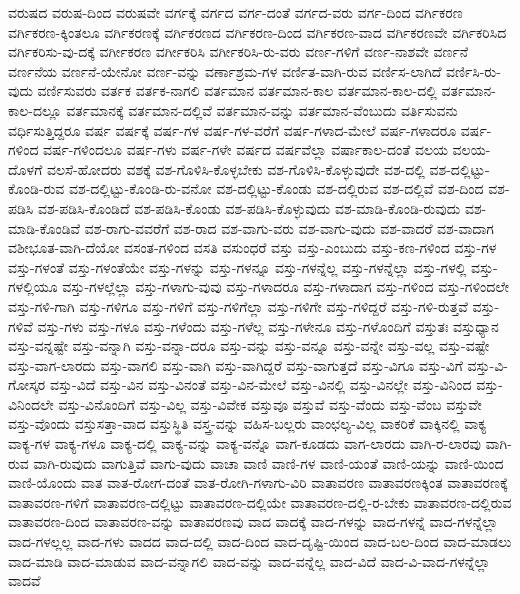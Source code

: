 {ವರುಷದ
ವರುಷ-ದಿಂದ
ವರುಷವೇ
ವರ್ಗಕ್ಕೆ
ವರ್ಗದ
ವರ್ಗ-ದಂತೆ
ವರ್ಗದ-ವರು
ವರ್ಗ-ದಿಂದ
ವರ್ಗಿಕರಣ
ವರ್ಗಿಕರಣ-ಕ್ಕಿಂತಲೂ
ವರ್ಗಿಕರಣಕ್ಕೆ
ವರ್ಗಿಕರಣದ
ವರ್ಗಿಕರಣ-ದಿಂದ
ವರ್ಗಿಕರಣ-ವಾದ
ವರ್ಗಿಕರಣವೇ
ವರ್ಗಿಕರಿಸಿದ
ವರ್ಗಿಕರಿಸು-ವು-ದಕ್ಕೆ
ವರ್ಗೀಕರಣ
ವರ್ಗೀಕರಿಸಿ
ವರ್ಗೀಕರಿಸಿ-ರು-ವರು
ವರ್ಣ-ಗಳಿಗೆ
ವರ್ಣ-ನಾಶವೇ
ವರ್ಣನೆ
ವರ್ಣನೆಯ
ವರ್ಣನೆ-ಯೇನೋ
ವರ್ಣ-ವನ್ನು
ವರ್ಣಾಶ್ರಮ-ಗಳ
ವರ್ಣಿತ-ವಾಗಿ-ರುವ
ವರ್ಣಿಸ-ಲಾಗಿದೆ
ವರ್ಣಿಸಿ-ರು-ವುದು
ವರ್ಣಿಸುವರು
ವರ್ತಕ
ವರ್ತಕ-ನಾಗಲಿ
ವರ್ತಮಾನ
ವರ್ತಮಾನ-ಕಾಲ
ವರ್ತಮಾನ-ಕಾಲ-ದಲ್ಲಿ
ವರ್ತಮಾನ-ಕಾಲ-ದಲ್ಲೂ
ವರ್ತಮಾನಕ್ಕೆ
ವರ್ತಮಾನ-ದಲ್ಲಿವೆ
ವರ್ತಮಾನ-ವನ್ನು
ವರ್ತಮಾನ-ವೆಂಬುದು
ವರ್ತಿಸುವನು
ವರ್ಧಿಸುತ್ತಿದ್ದರೂ
ವರ್ಷ
ವರ್ಷಕ್ಕೆ
ವರ್ಷ-ಗಳ
ವರ್ಷ-ಗಳ-ವರೆಗೆ
ವರ್ಷ-ಗಳಾದ-ಮೇಲೆ
ವರ್ಷ-ಗಳಾದರೂ
ವರ್ಷ-ಗಳಿಂದ
ವರ್ಷ-ಗಳಿಂದಲೂ
ವರ್ಷ-ಗಳು
ವರ್ಷ-ಗಳೇ
ವರ್ಷದ
ವರ್ಷವೆಲ್ಲಾ
ವರ್ಷಾಕಾಲ-ದಂತೆ
ವಲಯ
ವಲಯ-ದೊಳಗೆ
ವಲಸೆ-ಹೋದರು
ವಶಕ್ಕೆ
ವಶ-ಗೊಳಿಸಿ-ಕೊಳ್ಳಬೇಕು
ವಶ-ಗೊಳಿಸಿ-ಕೊಳ್ಳುವುದೇ
ವಶ-ದಲ್ಲಿ
ವಶ-ದಲ್ಲಿಟ್ಟು-ಕೊಂಡಿ-ರುವ
ವಶ-ದಲ್ಲಿಟ್ಟು-ಕೊಂಡಿ-ರು-ವನೋ
ವಶ-ದಲ್ಲಿಟ್ಟು-ಕೊಂಡು
ವಶ-ದಲ್ಲಿರುವ
ವಶ-ದಲ್ಲಿವೆ
ವಶ-ದಿಂದ
ವಶ-ಪಡಿಸಿ
ವಶ-ಪಡಿಸಿ-ಕೊಂಡಿದೆ
ವಶ-ಪಡಿಸಿ-ಕೊಂಡು
ವಶ-ಪಡಿಸಿ-ಕೊಳ್ಳುವುದು
ವಶ-ಮಾಡಿ-ಕೊಂಡಿ-ರುವುದು
ವಶ-ಮಾಡಿ-ಕೊಂಡಿವೆ
ವಶ-ರಾಗು-ವವರೆಗೆ
ವಶ-ರಾದ
ವಶ-ವಾಗು-ವರು
ವಶ-ವಾಗು-ವುದು
ವಶ-ವಾದರೆ
ವಶ-ವಾದಾಗ
ವಶೀಭೂತ-ವಾಗಿ-ದೆಯೋ
ವಸಂತ-ಗಳಿಂದ
ವಸತಿ
ವಸುಂಧರೆ
ವಸ್ತು
ವಸ್ತು-ಎಂಬುದು
ವಸ್ತು-ಕಣ-ಗಳಿಂದ
ವಸ್ತು-ಗಳ
ವಸ್ತು-ಗಳಂತೆ
ವಸ್ತು-ಗಳಂತೆಯೇ
ವಸ್ತು-ಗಳನ್ನು
ವಸ್ತು-ಗಳನ್ನೂ
ವಸ್ತು-ಗಳನ್ನೆಲ್ಲ
ವಸ್ತು-ಗಳನ್ನೆಲ್ಲಾ
ವಸ್ತು-ಗಳಲ್ಲಿ
ವಸ್ತು-ಗಳಲ್ಲಿಯೂ
ವಸ್ತು-ಗಳಲ್ಲೆಲ್ಲಾ
ವಸ್ತು-ಗಳಾಗು-ವುವು
ವಸ್ತು-ಗಳಾದರೂ
ವಸ್ತು-ಗಳಾದಾಗ
ವಸ್ತು-ಗಳಿಂದ
ವಸ್ತು-ಗಳಿಂದಲೇ
ವಸ್ತು-ಗಳಿ-ಗಾಗಿ
ವಸ್ತು-ಗಳಿಗೂ
ವಸ್ತು-ಗಳಿಗೆ
ವಸ್ತು-ಗಳಿಗೆಲ್ಲಾ
ವಸ್ತು-ಗಳಿಗೇ
ವಸ್ತು-ಗಳಿದ್ದರೆ
ವಸ್ತು-ಗಳಿ-ರುತ್ತವೆ
ವಸ್ತು-ಗಳಿವೆ
ವಸ್ತು-ಗಳು
ವಸ್ತು-ಗಳೂ
ವಸ್ತು-ಗಳೆಂದು
ವಸ್ತು-ಗಳೆಲ್ಲ
ವಸ್ತು-ಗಳೇನೂ
ವಸ್ತು-ಗಳೊಂದಿಗೆ
ವಸ್ತುತಃ
ವಸ್ತುಧ್ಯಾನ
ವಸ್ತು-ವನ್ನಷ್ಟೇ
ವಸ್ತು-ವನ್ನಾಗಿ
ವಸ್ತು-ವನ್ನಾ-ದರೂ
ವಸ್ತು-ವನ್ನು
ವಸ್ತು-ವನ್ನೂ
ವಸ್ತು-ವನ್ನೇ
ವಸ್ತು-ವಲ್ಲ
ವಸ್ತು-ವಷ್ಟೇ
ವಸ್ತು-ವಾಗ-ಲಾರದು
ವಸ್ತು-ವಾಗಲಿ
ವಸ್ತು-ವಾಗಿ
ವಸ್ತು-ವಾಗಿದ್ದರೆ
ವಸ್ತು-ವಾಗುತ್ತದೆ
ವಸ್ತು-ವಿಗೂ
ವಸ್ತು-ವಿಗೆ
ವಸ್ತು-ವಿ-ಗೋಸ್ಕರ
ವಸ್ತು-ವಿದೆ
ವಸ್ತು-ವಿನ
ವಸ್ತು-ವಿನಂತೆ
ವಸ್ತು-ವಿನ-ಮೇಲೆ
ವಸ್ತು-ವಿನಲ್ಲಿ
ವಸ್ತು-ವಿನಲ್ಲೇ
ವಸ್ತು-ವಿನಿಂದ
ವಸ್ತು-ವಿನಿಂದಲೇ
ವಸ್ತು-ವಿನೊಂದಿಗೆ
ವಸ್ತು-ವಿಲ್ಲ
ವಸ್ತು-ವಿವೇಕ
ವಸ್ತುವೂ
ವಸ್ತುವೆ
ವಸ್ತು-ವೆಂದು
ವಸ್ತು-ವೆಂಬ
ವಸ್ತುವೇ
ವಸ್ತು-ವೊಂದು
ವಸ್ತುಸತ್ತಾ-ವಾದ
ವಸ್ತುಸ್ಥಿತಿ
ವಸ್ತ್ರ-ವನ್ನು
ವಹಿಸ-ಬಲ್ಲರು
ವಾಂಛಲ್ಯ-ವಿಲ್ಲ
ವಾಕರಿಕೆ
ವಾಕ್ಕಿನಲ್ಲಿ
ವಾಕ್ಯ
ವಾಕ್ಯ-ಗಳ
ವಾಕ್ಯ-ಗಳೂ
ವಾಕ್ಯ-ದಲ್ಲಿ
ವಾಕ್ಯ-ವನ್ನು
ವಾಕ್ಯ-ವನ್ನೊ
ವಾಗ-ಕೂಡದು
ವಾಗ-ಲಾರದು
ವಾಗಿ-ರ-ಲಾರವು
ವಾಗಿ-ರುವ
ವಾಗಿ-ರುವುದು
ವಾಗುತ್ತಿವೆ
ವಾಗು-ವುದು
ವಾಚಾ
ವಾಣಿ
ವಾಣಿ-ಗಳ
ವಾಣಿ-ಯಂತೆ
ವಾಣಿ-ಯನ್ನು
ವಾಣಿ-ಯಿಂದ
ವಾಣಿ-ಯೊಂದು
ವಾತ
ವಾತ-ರೋಗ-ದಂತೆ
ವಾತ-ರೋಗಿ-ಗಳಾಗು-ವಿರಿ
ವಾತಾವರಣ
ವಾತಾವರಣಕ್ಕಿಂತ
ವಾತಾವರಣಕ್ಕೆ
ವಾತಾವರಣ-ಗಳಿಗೆ
ವಾತಾವರಣ-ದಲ್ಲಿಟ್ಟು
ವಾತಾವರಣ-ದಲ್ಲಿಯೇ
ವಾತಾವರಣ-ದಲ್ಲಿ-ರ-ಬೇಕು
ವಾತಾವರಣ-ದಲ್ಲಿರುವ
ವಾತಾವರಣ-ದಿಂದ
ವಾತಾವರಣ-ವನ್ನು
ವಾತಾವರಣವು
ವಾದ
ವಾದಕ್ಕೆ
ವಾದ-ಗಳನ್ನು
ವಾದ-ಗಳನ್ನೆ
ವಾದ-ಗಳನ್ನೆಲ್ಲಾ
ವಾದ-ಗಳಲ್ಲಲ್ಲ
ವಾದ-ಗಳು
ವಾದದ
ವಾದ-ದಲ್ಲಿ
ವಾದ-ದಿಂದ
ವಾದ-ದೃಷ್ಟಿ-ಯಿಂದ
ವಾದ-ಬಲ-ದಿಂದ
ವಾದ-ಮಾಡಲು
ವಾದ-ಮಾಡಿ
ವಾದ-ಮಾಡುವ
ವಾದ-ವನ್ನಾಗಲಿ
ವಾದ-ವನ್ನು
ವಾದ-ವನ್ನೆಲ್ಲ
ವಾದ-ವಿದೆ
ವಾದ-ವಿ-ವಾದ-ಗಳನ್ನೆಲ್ಲಾ
ವಾದವೆ
}
